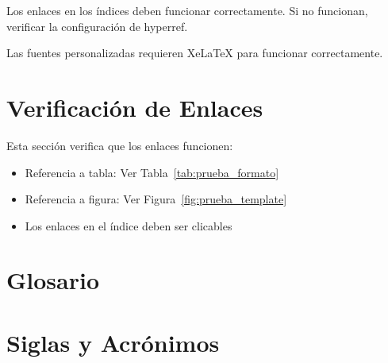 \documentclass{sener2025}
\begin{document}
\begin{calloutTip}[Consejo]
Los enlaces en los índices deben funcionar correctamente. Si no funcionan, verificar la configuración de hyperref.
\end{calloutTip}

\begin{calloutWarning}[Advertencia]
Las fuentes personalizadas requieren XeLaTeX para funcionar correctamente.
\end{calloutWarning}

\section{Verificación de Enlaces}

Esta sección verifica que los enlaces funcionen:
\begin{itemize}
  \item Referencia a tabla: Ver Tabla~\ref{tab:prueba_formato}
  \item Referencia a figura: Ver Figura~\ref{fig:prueba_template}
  \item Los enlaces en el índice deben ser clicables
\end{itemize}

\section*{Glosario}


\section*{Siglas y Acrónimos}


\end{document}
